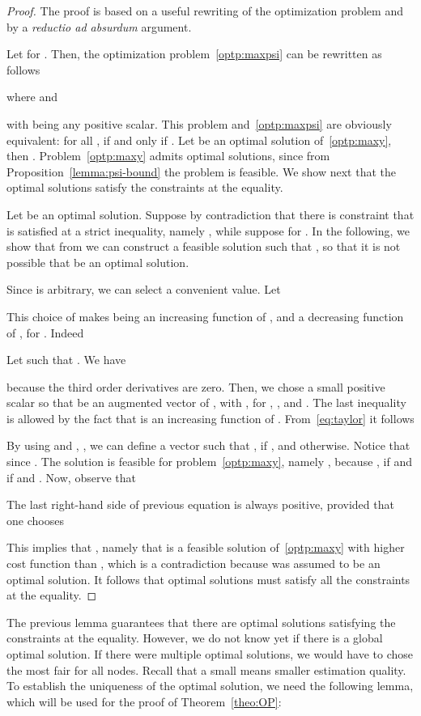 \documentclass[a4paper,notitlepage,onecolumn]{article}
\numberwithin{equation}{section}
\begin{document}
\begin{proof}
The proof is based on a useful rewriting of the optimization
problem and by a {\it reductio ad absurdum} argument.

Let  for . Then, the optimization problem~\eqref{optp:maxpsi} can be rewritten as follows

where  and

with  being any positive scalar. This problem
and~\eqref{optp:maxpsi} are obviously equivalent: for all
,  if and only if . Let  be an optimal solution of~\eqref{optp:maxy}, then
. Problem~\eqref{optp:maxy} admits optimal
solutions, since from Proposition~\ref{lemma:psi-bound} the
problem is feasible. We show next that the optimal solutions
satisfy the constraints at the equality.

Let  be an optimal solution. Suppose by contradiction that
there is constraint  that is satisfied at a strict inequality,
namely , while suppose 
for . In the following, we show that from  we can
construct a feasible solution  such that , so that it is not possible that  be an
optimal solution.

Since  is arbitrary, we can select a convenient value. Let

This choice of  makes  being an increasing
function of , and a decreasing function of , for . Indeed

Let  such that . We have

because the third order derivatives are zero. Then, we chose a small positive scalar  so that  be an augmented vector of , with ,  for , , and . The last inequality is allowed by the fact that  is an increasing function of . From~\eqref{eq:taylor} it follows

By using  and , , we can define
a vector  such that ,
 if , and
 otherwise. Notice that  since
. The solution  is feasible for
problem~\eqref{optp:maxy}, namely , because
,
 if  and  if  and . Now, observe that

The last right-hand side of previous equation is always positive, provided that one chooses

This implies that , namely that  is a feasible solution of~\eqref{optp:maxy} with higher cost function than , which is a contradiction because  was assumed to be an optimal solution. It follows that optimal solutions must satisfy all the constraints at the equality.
\end{proof}
The previous lemma guarantees that there are optimal solutions
satisfying the constraints at the equality. However, we do not
know yet if there is a global optimal solution. If there were
multiple optimal solutions, we would have to chose the most fair
for all nodes. Recall that a small  means smaller
estimation quality. To establish the uniqueness of the optimal
solution, we need the following lemma, which will be used for the
proof of Theorem~\ref{theo:OP}:
\end{document}
